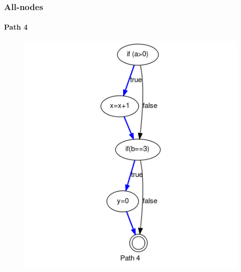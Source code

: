 \begin{frame}[c, hasprev=true, hasnext=false]
\frametitle{All-nodes}
\framesubtitle{Path 4}

\begin{figure}
	\centering
	\includegraphics[scale=.3]{aux/examples/all-nodes/all-nodes-criterion-example-path-4}
\end{figure}
\end{frame}